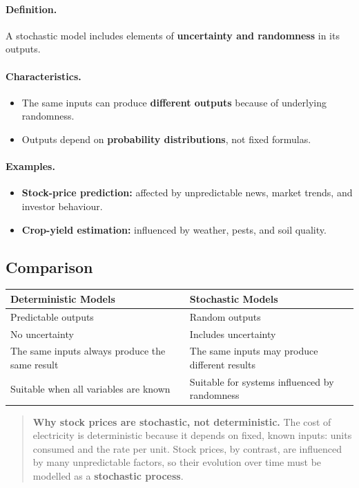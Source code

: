 \documentclass[12pt,openany]{book}
\theoremstyle{definition}
\theoremstyle{remark}
\begin{document}
\paragraph{Definition.}
A stochastic model includes elements of \textbf{uncertainty and randomness}
in its outputs.

\paragraph{Characteristics.}
\begin{itemize}
    \item The same inputs can produce \textbf{different outputs} because of
    underlying randomness.
    \item Outputs depend on \textbf{probability distributions}, not fixed
    formulas.
\end{itemize}

\paragraph{Examples.}
\begin{itemize}
    \item \textbf{Stock-price prediction:} affected by unpredictable news,
    market trends, and investor behaviour.
    \item \textbf{Crop-yield estimation:} influenced by weather, pests, and
    soil quality.
\end{itemize}

\subsection{Comparison}

\begin{longtable}{@{}L{0.46\textwidth}L{0.46\textwidth}@{}}
\toprule
\textbf{Deterministic Models} & \textbf{Stochastic Models} \\
\midrule
Predictable outputs & Random outputs \\
No uncertainty & Includes uncertainty \\
The same inputs always produce the same result &
The same inputs may produce different results \\
Suitable when all variables are known &
Suitable for systems influenced by randomness \\
\bottomrule
\end{longtable}

\begin{quote}
\colorbox{diagramBlue!8}{%
\parbox{\dimexpr\linewidth-2\fboxsep\relax}{%
\textbf{Why stock prices are stochastic, not deterministic.}
The cost of electricity is deterministic because it depends on fixed, known
inputs: units consumed and the rate per unit. Stock prices, by contrast, are
influenced by many unpredictable factors, so their evolution over time must
be modelled as a \textbf{stochastic process}.}}
\end{quote}
\end{document}
